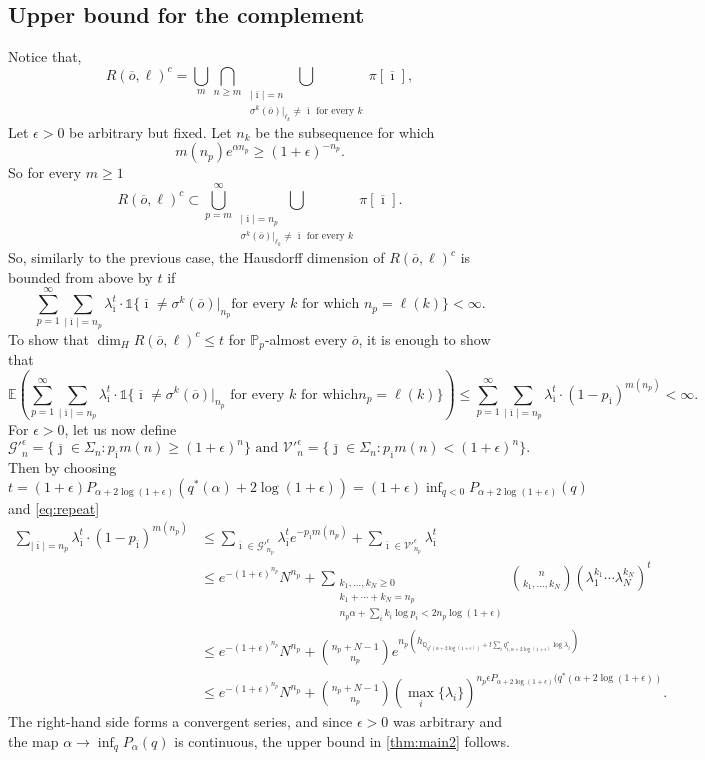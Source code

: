 \documentclass[12pt,]{article}
\theoremstyle{definition}
\theoremstyle{remark}
\renewcommand{\Bbb}[1]{\mathbb{#1}}
\newcommand{\bbE}{{\Bbb E}}
\newcommand{\bbP}{{\Bbb P}}
\newcommand{\bbQ}{{\Bbb Q}}         %
\newcommand{\0}{\mathbf{0}}
\renewcommand{\ge}{\geq}
\newcommand{\bi}{{\overline {\imath}}}
\newcommand{\bj}{{\overline  {\jmath}}}
\newcommand{\bo}{{\overline o}}
\begin{document}
\subsection{Upper bound for the complement}\label{sec:upperforcomp}

Notice that,
\[
  R(\bo, \ell)^c= \bigcup_{m}\bigcap_{n\ge m}\bigcup_{\substack{|\bi|=n\\
  \sigma^k(\bo)|_{\ell_k}\neq\bi\text{ for every $k$}}}\pi[\bi],
\]
Let $\epsilon>0$ be arbitrary but fixed. Let $n_k$ be the subsequence for which
$$
m(n_p)e^{\alpha n_p}\geq(1+\epsilon)^{-n_p}.
$$
So for every $m\geq1$
\[
  R(\bo, \ell)^c\subset \bigcup_{p=m}^\infty\bigcup_{\substack{|\bi|=n_p\\
  \sigma^k(\bo)|_{\ell_k}\neq\bi\text{ for every $k$}}}\pi[\bi].
\]
So, similarly to the previous case, the Hausdorff dimension of $R(\bo, \ell)^c$ is bounded from above by $t$ if
$$
\sum_{p=1}^\infty\sum_{|\bi|=n_p}\lambda_{\bi}^t\cdot\mathbb 1\{\bi\neq\sigma^k(\bo)|_{n_p} \text{
for every $k$ for which }n_p=\ell(k)\}<\infty.
$$
To show that $\dim_HR(\bo,\ell)^c\leq t$ for $\bbP_p$-almost every $\bo$, it is enough to show that
\[
  \bbE\left(\sum_{p=1}^\infty\sum_{|\bi|=n_p}\lambda_{\bi}^t\cdot\mathbb
  1\{\bi\neq\sigma^k(\bo)|_{n_p} \text{ for every $k$ for which
}n_p=\ell(k)\}\right)\leq\sum_{p=1}^\infty\sum_{|\bi|=n_p}\lambda_{\bi}^t\cdot(1-p_{\bi})^{m(n_p)}<\infty.
\]
For $\epsilon>0$, let us now define
\begin{equation}\label{eq:modifGV}
  \mathcal{G'}_n^\epsilon=\{\bj\in\Sigma_n:p_{\bi}m(n)\geq(1+\epsilon)^n\}\text{ and
  }\mathcal{V'}_n^\epsilon=\{\bj\in\Sigma_n:p_{\bi}m(n)<(1+\epsilon)^n\}.
\end{equation}
Then by choosing
$t=(1+\epsilon)P_{\alpha+2\log(1+\epsilon)}(q^*(\alpha)+2\log(1+\epsilon))=(1+\epsilon)\inf_{q<0}P_{\alpha+2\log(1+\epsilon)}(q)$
and \cref{eq:repeat}
\[\begin{split}
  \sum_{|\bi|=n_p}\lambda_{\bi}^t\cdot(1-p_{\bi})^{m(n_p)}
  &\leq\sum_{\bi\in\mathcal{G'}_{n_p}^\epsilon}\lambda_{\bi}^te^{-p_{\bi}m(n_p)}+\sum_{\bi\in\mathcal{V'}_{n_p}^\epsilon}\lambda_{\bi}^t\\
  &\leq e^{-(1+\epsilon)^{n_p}}N^{n_p}+\sum_{\substack{k_1,\ldots,k_N\geq0\\ k_1+\cdots+k_N=n_p \\ n_p\alpha+\sum_{i}k_i\log p_i<2n_p\log(1+\epsilon)}}\binom{n}{k_1,\ldots,k_N}\left(\lambda_1^{k_1}\cdots\lambda_N^{k_N}\right)^t\\
  &\leq e^{-(1+\epsilon)^{n_p}}N^{n_p}+\binom{n_p+N-1}{n_p}e^{n_p\left(h_{\bbQ_{q^*(\alpha+2\log(1+\epsilon))}+t\sum_{i}q_{i,\alpha+2\log(1+\epsilon)}^*\log\lambda_i}\right)}\\
  &\leq e^{-(1+\epsilon)^{n_p}}N^{n_p}+\binom{n_p+N-1}{n_p}\left(\max_i\{\lambda_i\}\right)^{n_p\epsilon P_{\alpha+2\log(1+\epsilon)}(q^*(\alpha+2\log(1+\epsilon))}.
\end{split}\]
The right-hand side forms a convergent series, and since $\epsilon>0$ was arbitrary and the map
$\alpha\to\inf_{q}P_\alpha(q)$ is continuous, the upper bound in \cref{thm:main2} follows.
\end{document}
